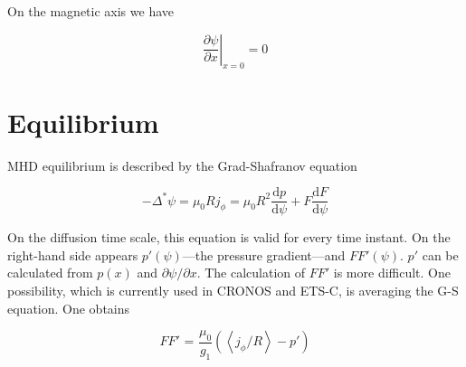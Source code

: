 On the magnetic axis we have

\[{\left. {\frac{{\partial \psi }}{{\partial x }}} \right|_{x = 0}} = 0\]

\section{Equilibrium}

MHD equilibrium is described by the Grad-Shafranov equation

\[-{\Delta ^*}\psi  =  {\mu _0}R{j_\phi } =  {\mu _0}{R^2}\frac{{{\text{d}}p}}{{{\text{d}}\psi }} + F\frac{{{\text{d}}F}}{{{\text{d}}\psi }}\]

On the diffusion time scale, this equation is valid for every time instant. 
On the right-hand side appears $p'\left( \psi  \right)$---the pressure gradient---and 
$FF'\left( \psi  \right)$. $p'$ can be calculated from $p\left( x \right)$ and 
$\partial \psi /\partial x$. The calculation of $FF'$ is more difficult.
One possibility, which is currently used in CRONOS and ETS-C, is averaging the G-S
equation. One obtains

\[FF'{\text{  =  }}\frac{{{\mu _0}}}{{{g_1}}}\left( {\left\langle {{j_\phi }/R} \right\rangle  - p'} \right)\]

